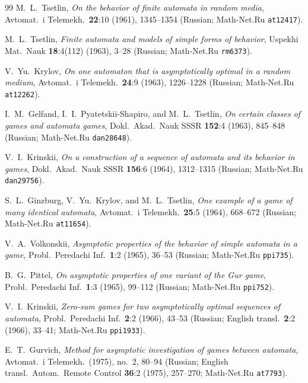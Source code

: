 \documentclass[11pt,reqno]{amsart}
\theoremstyle{definition}
\theoremstyle{remark}
\begin{document}
\begin{thebibliography}{99}
M.~L.~Tsetlin, \emph{On the behavior of finite automata in random media}, Avtomat.\ i Telemekh.\ \textbf{22}:10 (1961), 1345--1354 (Russian; Math-Net.Ru \texttt{at12417}).

M.~L.~Tsetlin, \emph{Finite automata and models of simple forms of behavior}, Uspekhi Mat.\ Nauk \textbf{18}:4(112) (1963), 3--28 (Russian; Math-Net.Ru \texttt{rm6373}).

V.~Yu.~Krylov, \emph{On one automaton that is asymptotically optimal in a random medium}, Avtomat.\ i Telemekh.\ \textbf{24}:9 (1963), 1226--1228 (Russian; Math-Net.Ru \texttt{at12262}).

I.~M.~Gelfand, I.~I.~Pyatetskii-Shapiro, and M.~L.~Tsetlin, \emph{On certain classes of games and automata games}, Dokl.\ Akad.\ Nauk SSSR \textbf{152}:4 (1963), 845--848 (Russian; Math-Net.Ru \texttt{dan28648}).

V.~I.~Krinskii, \emph{On a construction of a sequence of automata and its behavior in games}, Dokl.\ Akad.\ Nauk SSSR \textbf{156}:6 (1964), 1312--1315 (Russian; Math-Net.Ru \texttt{dan29756}).

S.~L.~Ginzburg, V.~Yu.~Krylov, and M.~L.~Tsetlin, \emph{One example of a game of many identical automata}, Avtomat.\ i Telemekh.\ \textbf{25}:5 (1964), 668--672 (Russian; Math-Net.Ru \texttt{at11654}).

V.~A.~Volkonskii, \emph{Asymptotic properties of the behavior of simple automata in a game}, Probl.\ Peredachi Inf.\ \textbf{1}:2 (1965), 36--53 (Russian; Math-Net.Ru \texttt{ppi735}).

B.~G.~Pittel, \emph{On asymptotic properties of one variant of the Gur game}, Probl.\ Peredachi Inf.\ \textbf{1}:3 (1965), 99--112 (Russian; Math-Net.Ru \texttt{ppi752}).

V.~I.~Krinskii, \emph{Zero-sum games for two asymptotically optimal sequences of automata}, Probl.\ Peredachi Inf.\ \textbf{2}:2 (1966), 43--53 (Russian; English transl.\ \textbf{2}:2 (1966), 33--41; Math-Net.Ru \texttt{ppi1933}).

E.~T.~Gurvich, \emph{Method for asymptotic investigation of games between automata}, Avtomat.\ i Telemekh.\ (1975), no.~2, 80--94 (Russian; English transl.\ Autom.\ Remote Control \textbf{36}:2 (1975), 257--270; Math-Net.Ru \texttt{at7793}).


\end{thebibliography}
\end{document}
